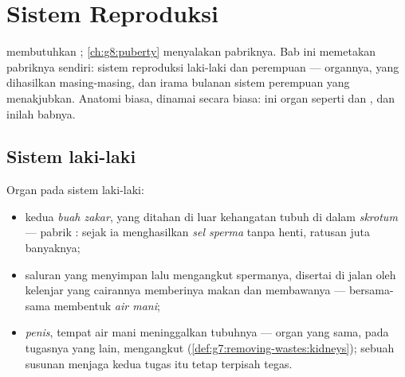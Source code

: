 \chapter{Sistem Reproduksi}\label{ch:g8:reproductive-systems}

 membutuhkan ;
\cref{ch:g8:puberty} menyalakan pabriknya. Bab ini memetakan
pabriknya sendiri: sistem reproduksi laki-laki dan
perempuan --- organnya,  yang dihasilkan
masing-masing, dan irama bulanan sistem perempuan yang
menakjubkan. Anatomi biasa, dinamai secara biasa: ini organ
seperti  dan , dan inilah babnya.

\section{Sistem laki-laki}

\begin{definition}\label{def:g8:reproductive-systems:male}
Organ pada sistem laki-laki:
\begin{itemize}
  \item kedua \emph{buah zakar}, yang
        ditahan di luar kehangatan tubuh di dalam
        \emph{skrotum} --- pabrik : sejak 
        ia menghasilkan \emph{sel sperma}
        tanpa henti, ratusan juta banyaknya;
  \item saluran yang menyimpan lalu mengangkut spermanya,
        disertai di jalan oleh kelenjar yang cairannya
        memberinya makan dan membawanya --- bersama-sama
        membentuk \emph{air mani};
  \item \emph{penis}, tempat air mani
        meninggalkan tubuhnya --- organ yang sama, pada
        tugasnya yang lain, mengangkut 
        (\cref{def:g7:removing-wastes:kidneys}); sebuah
        susunan  menjaga kedua tugas itu tetap
        terpisah tegas.
\end{itemize}
\end{definition}

